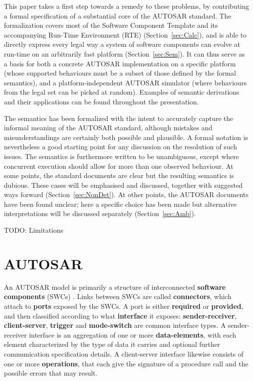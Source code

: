 \documentclass[twocolumn]{article}
\begin{document}
This paper takes a first step towards a remedy to these problems, by contributing a formal specification of a substantial core of the AUTOSAR standard. The formalization covers most of the Software Component Template and its accompanying Run-Time Environment (RTE) (Section~\ref{sec:Calc}), and is able to directly express every legal way a system of software components can evolve at run-time on an arbitrarily fast platform (Section~\ref{sec:Sem}). It can thus serve as a basis for both a concrete AUTOSAR implementation on a specific platform (whose supported behaviours must be a subset of those defined by the formal semantics), and a platform-independent AUTOSAR simulator (where behaviours from the legal set can be picked at random). Examples of semantic derivations and their applications can be found throughout the presentation.

The semantics has been formalized with the intent to accurately capture the informal meaning of the AUTOSAR standard, although mistakes and misunderstandings are certainly both possible and plausible. A formal notation is nevertheless a good starting point for any discussion on the resolution of such issues. The semantics is furthermore written to be unambiguous, except where concurrent execution should allow for more than one observed behaviour. At some points, the standard documents are clear but the resulting semantics is dubious. These cases will be emphasised and discussed, together with suggested ways forward (Section~\ref{sec:NonDet}). At other points, the AUTOSAR documents have been found unclear; here a specific choice has been made but alternative interpretations will be discussed separately (Section~\ref{sec:Amb}).

TODO: Limitations


\section{AUTOSAR}
\label{sec:autosar}

An AUTOSAR model is primarily a structure of interconnected \textbf{software components} (SWCs) \cite{AR:SWC}. Links between SWCs are called \textbf{connectors}, which attach to \textbf{ports} exposed by the SWCs. A port is either \textbf{required} or \textbf{provided}, and then classified according to what \textbf{interface} it exposes: \textbf{sender-receiver}, \textbf{client-server}, \textbf{trigger} and \textbf{mode-switch} are common interface types. A sender-receiver interface is an aggregation of one or more \textbf{data-elements}, with each element characterized by the type of data it carries and optional further communication specification details. A client-server interface likewise consists of one or more \textbf{operations}, that each give the signature of a procedure call and the possible errors that may result.
\end{document}
